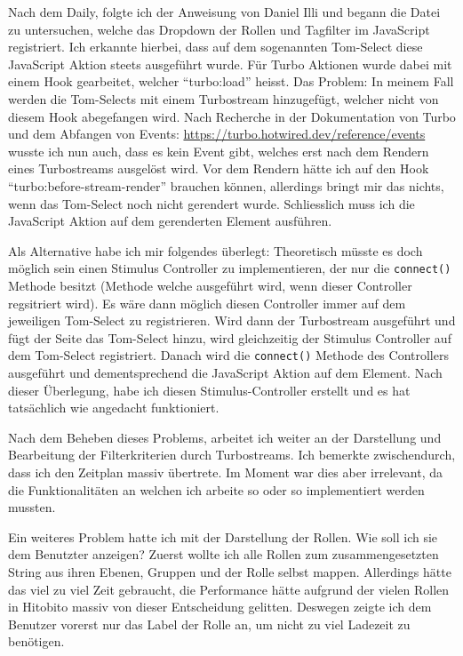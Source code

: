 Nach dem Daily, folgte ich der Anweisung von Daniel Illi und begann die Datei zu untersuchen, welche das Dropdown der Rollen und Tagfilter im JavaScript registriert.
Ich erkannte hierbei, dass auf dem sogenannten Tom-Select diese JavaScript Aktion steets ausgeführt wurde. Für Turbo Aktionen wurde dabei mit einem Hook gearbeitet, welcher
``turbo:load'' heisst. Das Problem: In meinem Fall werden die Tom-Selects mit einem Turbostream hinzugefügt, welcher nicht von diesem Hook abegefangen wird.
Nach Recherche in der Dokumentation von Turbo und dem Abfangen von Events: \href{Dokumentation}{https://turbo.hotwired.dev/reference/events} wusste ich nun auch, dass
es kein Event gibt, welches erst nach dem Rendern eines Turbostreams ausgelöst wird. Vor dem Rendern hätte ich auf den Hook ``turbo:before-stream-render'' brauchen können,
allerdings bringt mir das nichts, wenn das Tom-Select noch nicht gerendert wurde. Schliesslich muss ich die JavaScript Aktion auf dem gerenderten Element ausführen.

Als Alternative habe ich mir folgendes überlegt: Theoretisch müsste es doch möglich sein einen Stimulus Controller zu implementieren, der nur die \texttt{connect()} Methode
besitzt (Methode welche ausgeführt wird, wenn dieser Controller regsitriert wird). Es wäre dann möglich diesen Controller immer auf dem jeweiligen Tom-Select zu registrieren.
Wird dann der Turbostream ausgeführt und fügt der Seite das Tom-Select hinzu, wird gleichzeitig der Stimulus Controller auf dem Tom-Select registriert. Danach wird die \texttt{connect()}
Methode des Controllers ausgeführt und dementsprechend die JavaScript Aktion auf dem Element. Nach dieser Überlegung, habe ich diesen Stimulus-Controller 
erstellt und es hat tatsächlich wie angedacht funktioniert.

Nach dem Beheben dieses Problems, arbeitet ich weiter an der Darstellung und Bearbeitung der Filterkriterien durch Turbostreams.
Ich bemerkte zwischendurch, dass ich den Zeitplan massiv übertrete. Im Moment war dies aber irrelevant, da die Funktionalitäten an welchen ich 
arbeite so oder so implementiert werden mussten.

Ein weiteres Problem hatte ich mit der Darstellung der Rollen. Wie soll ich sie dem Benutzter anzeigen? Zuerst wollte ich alle Rollen zum zusammengesetzten
String aus ihren Ebenen, Gruppen und der Rolle selbst mappen. Allerdings hätte das viel zu viel Zeit gebraucht, die Performance hätte aufgrund der vielen Rollen in
Hitobito massiv von dieser Entscheidung gelitten. Deswegen zeigte ich dem Benutzer vorerst nur das Label der Rolle an, um nicht zu viel Ladezeit zu benötigen.

